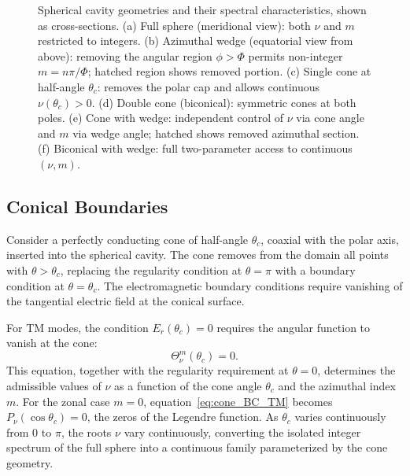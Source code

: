 \documentclass[
  aip,
  amsmath,amssymb,
  preprint
]{revtex4-1}
\begin{document}
\begin{figure}[htbp]

\caption{Spherical cavity geometries and their spectral characteristics, shown as cross-sections.
(a) Full sphere (meridional view): both $\nu$ and $m$ restricted to integers.
(b) Azimuthal wedge (equatorial view from above): removing the angular region $\phi > \Phi$ permits non-integer $m = n\pi/\Phi$; hatched region shows removed portion.
(c) Single cone at half-angle $\theta_c$: removes the polar cap and allows continuous $\nu(\theta_c) > 0$.
(d) Double cone (biconical): symmetric cones at both poles.
(e) Cone with wedge: independent control of $\nu$ via cone angle and $m$ via wedge angle; hatched shows removed azimuthal section.
(f) Biconical with wedge: full two-parameter access to continuous $(\nu, m)$.}
\label{fig:geometries}
\end{figure}


\subsection{Conical Boundaries}

Consider a perfectly conducting cone of half-angle $\theta_c$, coaxial with the polar axis, inserted into the spherical cavity. The cone removes from the domain all points with $\theta > \theta_c$, replacing the regularity condition at $\theta = \pi$ with a boundary condition at $\theta = \theta_c$. The electromagnetic boundary conditions require vanishing of the tangential electric field at the conical surface.

For TM modes, the condition $E_r(\theta_c) = 0$ requires the angular function to vanish at the cone:
\begin{equation}
\Theta_\nu^m(\theta_c) = 0.
\label{eq:cone_BC_TM}
\end{equation}
This equation, together with the regularity requirement at $\theta = 0$, determines the admissible values of $\nu$ as a function of the cone angle $\theta_c$ and the azimuthal index $m$. For the zonal case $m = 0$, equation~\eqref{eq:cone_BC_TM} becomes $P_\nu(\cos\theta_c) = 0$, the zeros of the Legendre function. As $\theta_c$ varies continuously from $0$ to $\pi$, the roots $\nu$ vary continuously, converting the isolated integer spectrum of the full sphere into a continuous family parameterized by the cone geometry.
\end{document}
